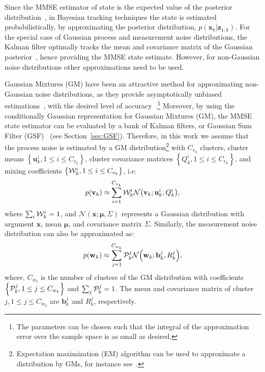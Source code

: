 \documentclass[10pt,twocolumn,twoside]{IEEEtran}
\newcommand{\corcol}[1]{\textcolor{CorCol}{#1}}
\begin{document}
Since the MMSE estimator of state is the expected value of the posterior distribution~\cite{bar2001estimation,poor_introduction_1994}, in Bayesian tracking techniques the state is estimated probabilistically, by approximating the posterior distribution, \(p {\left(\mathbf{x}_k|\mathbf{z}_{1:k}\right)} \). For the special case of Gaussian process and measurement noise distributions, \corcol{the} Kalman filter optimally tracks the mean and covariance matrix of the Gaussian posterior~\cite{ho_bayesian_1964}, hence providing the MMSE state estimate. However, for non-Gaussian noise distributions other approximations need to be used. 

Gaussian Mixtures (GM) have been an attractive method for approximating non-Gaussian noise distributions, as they provide asymptotically unbiased estimations~\cite{1962KernelDensityEstimation}, with the desired level of accuracy~\cite{anderson1979optimal}.\footnote{The parameters can be chosen such that the integral of the approximation error over the sample space is as small as desired.} Moreover, by using the conditionally Gaussian representation for Gaussian Mixtures (GM), the MMSE state estimator can be evaluated by a bank of Kalman filters, or Gaussian Sum Filter (GSF)~\cite{bar2001estimation,ackerson_state_1970} (see Section~\ref{sec:GSF}). Therefore, in this work we assume that the process noise is estimated by a GM distribution\footnote{\corcol{Expectation maximization (EM) algorithm can be used to approximate a distribution by GMs, for instance see~\cite{mclachlan2004finite}.}} with \(C_{v_k}\) clusters, cluster means \(\left\lbrace \mathbf{u}^i_k,1 \leq i \leq C_{v_k}\right\rbrace  \), cluster covariance matrices \(\left\lbrace Q^i_k,1 \leq i \leq C_{v_k}\right\rbrace\), and mixing coefficients \(\left\lbrace \corcol{\mathcal{W}^i_k},1 \leq i \leq C_{v_k}\right\rbrace\), i.e. 
\begin{align}
\label{eq:priorDist}
p {\left(\mathbf{v}_k\right)} \approx \sum \limits _{i=1}^{C_{v_k}} \corcol{\mathcal{W}^i_k} \mathcal{N}{\left( \mathbf{v}_k; \mathbf{u}^i_k, Q^i_k \right)},
\end{align}
where \(\sum _{i}\corcol{\mathcal{W}^i_k}=1\), and \(\mathcal{N}{\left( \mathbf{x};\boldsymbol{\mu},\Sigma \right)} \) represents a Gaussian distribution with argument \(\mathbf{x}\), mean \(\boldsymbol{\mu}\), and covariance matrix \(\Sigma\). Similarly, the measurement noise distribution can also be approximated as:
\begin{align}
\label{eq:likelihoodDist}
p {\left(\mathbf{w}_k\right)} \approx \sum \limits _{j=1}^{C_{w_k}} \corcol{\mathcal{P}^j_k} \mathcal{N}{\left( \mathbf{w}_k; {\mathbf{b}}^j_k, R^j_k \right)},
\end{align}
where, \(C_{w_k}\) is the number of clusters of the GM distribution with coefficients \(\left\lbrace \corcol{\mathcal{P}^j_k},1 \leq j \leq C_{w_k}\right\rbrace  \) and \(\sum _{j} \corcol{\mathcal{P}^j_k}=1\). The mean and covariance matrix of cluster \( j,1 \leq j \leq C_{w_k}\) are \({\mathbf{b}}^j_k\) and \(R^j_k\), respectively. 
\end{document}

